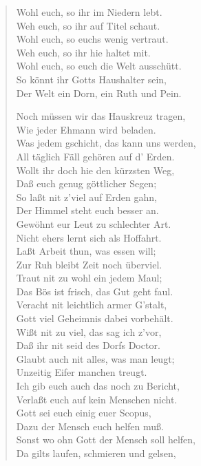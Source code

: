 \begin{verse}
Wohl euch, so ihr im Niedern lebt.\\
Weh euch, so ihr auf Titel schaut.\\
Wohl euch, so euchs wenig vertraut.\\
Weh euch, so ihr hie haltet mit.\\
Wohl euch, so euch die Welt ausschütt.\\
So könnt ihr Gotts Haushalter sein,\\
Der Welt ein Dorn, ein Ruth und Pein.

Noch müssen wir das Hauskreuz tragen,\\
Wie jeder Ehmann wird beladen.\\
Was jedem gschicht, das kann uns werden,\\
All täglich Fäll gehören auf d’ Erden.\\
Wollt ihr doch hie den kürzsten Weg,\\
Daß euch genug göttlicher Segen;\\
So laßt nit z’viel auf Erden gahn,\\
Der Himmel steht euch besser an.\\
Gewöhnt eur Leut zu schlechter Art.\\
Nicht ehers lernt sich als Hoffahrt.\\
Laßt Arbeit thun, was essen will;\\
Zur Ruh bleibt Zeit noch überviel.\\
Traut nit zu wohl ein jedem Maul;\\
Das Bös ist frisch, das Gut geht faul.\\
Veracht nit leichtlich armer G’stalt,\\
Gott viel Geheimnis dabei vorbehält.\\
Wißt nit zu viel, das sag ich z’vor,\\
Daß ihr nit seid des Dorfs Doctor.\\
Glaubt auch nit alles, was man leugt;\\
Unzeitig Eifer manchen treugt.\\
Ich gib euch auch das noch zu Bericht,\\
Verlaßt euch auf kein Menschen nicht.\\
Gott sei euch einig euer Scopus,\\
Dazu der Mensch euch helfen muß.\\
Sonst wo ohn Gott der Mensch soll helfen,\\
Da gilts laufen, schmieren und gelsen,
\end{verse}


